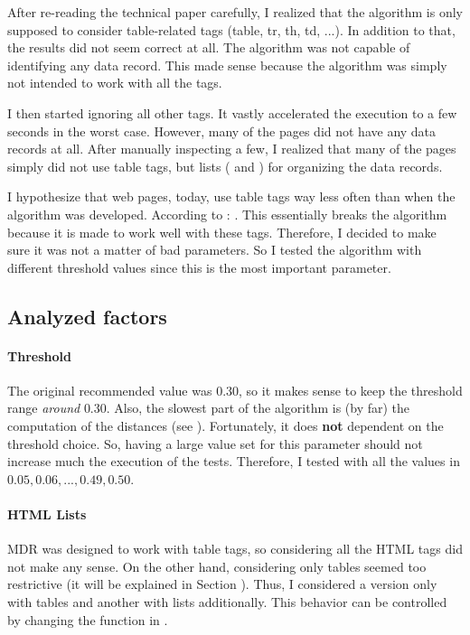 \documentclass[10pt]{article}
\begin{document}
After re-reading the technical paper carefully, I realized that the algorithm is only supposed to consider table-related tags (table, tr, th, td, ...). In addition to that, the results did not seem correct at all. The algorithm was not capable of identifying any data record. This made sense because the algorithm was simply not intended to work with all the tags. 

I then started ignoring all other tags. It vastly accelerated the execution to a few seconds in the worst case. However, many of the pages did not have any data records at all. After manually inspecting a few, I realized that many of the pages simply did not use table tags, but lists ( and ) for organizing the data records. 

I hypothesize that web pages, today, use table tags way less often than when the algorithm was developed. According to \cite{tables-basics}: . This essentially breaks the algorithm because it is made to work well with these tags. Therefore, I decided to make sure it was not a matter of bad parameters. So I tested the algorithm with different threshold values since this is the most important parameter. 



\subsection{Analyzed factors} \label{txt:analyzed-factors}

\paragraph{Threshold}

The original recommended value was $0.30$, so it makes sense to keep the threshold range \emph{around} $0.30$. Also, the slowest part of the algorithm is (by far) the computation of the distances (see ). Fortunately, it does \textbf{not} dependent on the threshold choice. So, having a large value set for this parameter should not increase much the execution of the tests. Therefore, I tested with all the values in ${0.05, 0.06, ..., 0.49, 0.50}$.

\paragraph{HTML Lists} 

MDR was designed to work with table tags, so considering all the HTML tags did not make any sense. On the other hand, considering only tables seemed too restrictive (it will be explained in Section ). Thus, I considered a version only with tables and another with lists additionally. This behavior can be controlled by changing the function \footnotemark in .
\end{document}
